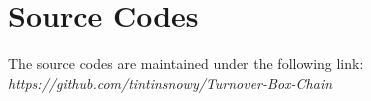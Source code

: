 
\section{Source Codes}
The source codes are maintained under the following link:
\textit{https://github.com/tintinsnowy/Turnover-Box-Chain}